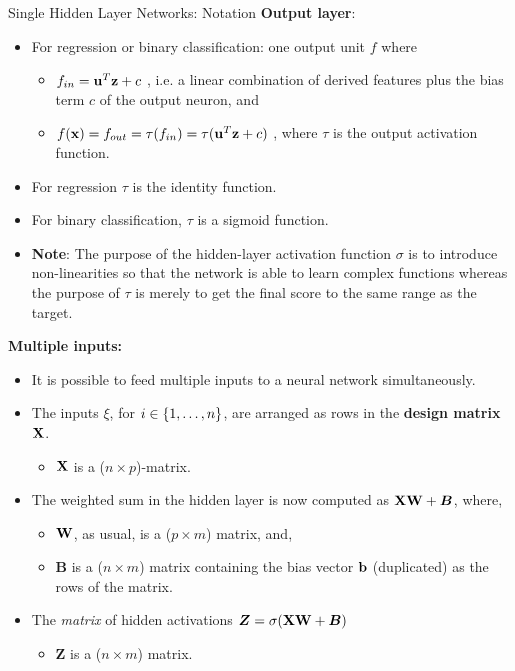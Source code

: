 \begin{vbframe}{Single Hidden Layer Networks: Notation}
  \textbf{Output layer}:
  \begin{itemize}
    \vspace{4mm}
    \item For regression or binary classification: one output unit $f$ where
      \begin{itemize}
        \item $f_{in} = \mathbf{u}^T \mathbf{z} + c$ , i.e. a linear combination of derived features plus the bias term $c$ of the output neuron, and
        \vspace{2mm}
        \item $f(\mathbf{x})= f_{out} = \tau(f_{in}) = \tau(\mathbf{u}^T \mathbf{z} + c)$ , where $\tau$ is the output activation function.
      \end{itemize}
    \item For regression $\tau$ is the identity function.
    \item For binary classification, $\tau$ is a sigmoid function.
    \item \textbf{Note}: The purpose of the hidden-layer activation function $\sigma$ is to introduce non-linearities so that the network is able to learn complex functions whereas the purpose of $\tau$ is merely to get the final score to the same range as the target.
  \end{itemize}

\framebreak 

  \textbf{%
  Multiple inputs:}
  \begin{itemize}
    \item It is possible to feed multiple inputs to a neural network simultaneously.
    \vspace{2mm}
    \item The inputs $\xi$, for $i \in \{1, \ldots, n\}$, are arranged as rows in the \textbf{design matrix} $\mathbf{X}$.
    \begin{itemize}
      \item $\mathbf{X}$ is a ($n \times p$)-matrix.
    \end{itemize}
    \vspace{2mm}
    \item The weighted sum in the hidden layer is now computed as $\mathbf{X}\mathbf{W} + \bm{B}$, where,
      \begin{itemize}
        \item $\mathbf{W}$, as usual, is a ($p \times m$) matrix, and,
        \vspace{2mm}
        \item $\bm{B}$ is a ($n \times m$) matrix containing the bias vector $\mathbf{b}$ (duplicated) as the rows of the matrix.
      \end{itemize}
    \vspace{2mm}
    \item The \textit{matrix} of hidden activations $\bm{Z} = \sigma(\mathbf{X}\mathbf{W} + \bm{B})$
    \begin{itemize}
      \item $\bm{Z}$ is a ($n \times m$) matrix.
    \end{itemize}
  \end{itemize}


\end{vbframe}
